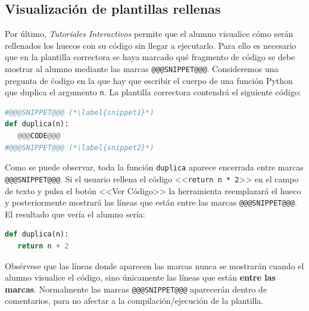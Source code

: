 \documentclass[]{article}
\newcommand{\code}[1]{{\lstinline[basicstyle=\ttfamily,mathescape]!#1!}}
\newcommand{\toolname}{\emph{Tutoriales Interactivos}}
\begin{document}
\subsection{Visualización de plantillas rellenas}
Por último, \toolname{} permite que el alumno visualice cómo serán rellenados los huecos con su código sin llegar a ejecutarlo. Para ello es necesario que en la plantilla correctora se haya marcado qué fragmento de código se debe mostrar al alumno mediante las marcas \code{@@@SNIPPET@@@}. Consideremos una pregunta de ćodigo en la que hay que escribir el cuerpo de una función Python que duplica el argumento \code{n}. La plantilla correctora contendrá el siguiente código:
\begin{lstlisting}[language=Python,basicstyle=\ttfamily, otherkeywords={with}]
#@@@SNIPPET@@@ (*\label{snippet1}*)
def duplica(n):
   @@@CODE@@@
#@@@SNIPPET@@@ (*\label{snippet2}*)
\end{lstlisting}
Como se puede observar, toda la función \code{duplica} aparece encerrada entre marcas \code{@@@SNIPPET@@@}. Si el usuario rellena el código <<\code{return n * 2}>> en el campo de texto y pulsa el botón <<Ver Código>> la herramienta reemplazará el hueco y posteriormente mostrará las líneas que están entre las marcas \code{@@@SNIPPET@@@}. El resultado que vería el alumno sería:
\begin{lstlisting}[language=Python,basicstyle=\ttfamily, otherkeywords={with}]
def duplica(n):
   return n + 2
\end{lstlisting}
Obsérvese que las líneas donde aparecen las marcas nunca se mostrarán cuando el alumno visualice el código, sino únicamente las líneas que están \textbf{entre las marcas}. Normalmente las marcas \code{@@@SNIPPET@@@} aparecerán dentro de comentarios, para no afectar a la compilación/ejecución de la plantilla.
\end{document}
